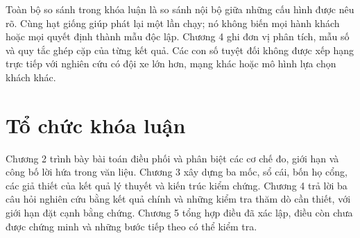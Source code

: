 Toàn bộ so sánh trong khóa luận là so sánh nội bộ giữa những cấu hình được nêu rõ. Cùng
hạt giống giúp phát lại một lần chạy; nó không biến mọi hành khách hoặc mọi quyết định
thành mẫu độc lập. Chương 4 ghi đơn vị phân tích, mẫu số và quy tắc ghép cặp của từng kết
quả. Các con số tuyệt đối không được xếp hạng trực tiếp với nghiên cứu có đội xe lớn hơn,
mạng khác hoặc mô hình lựa chọn khách khác.

\section{Tổ chức khóa luận}

Chương 2 trình bày bài toán điều phối và phân biệt các cơ chế đo, giới hạn và công bố lời
hứa trong văn liệu. Chương 3 xây dựng ba mốc, sổ cái, bốn họ cổng, các giả thiết của kết quả
lý thuyết và kiến trúc kiểm chứng. Chương 4 trả lời ba câu hỏi nghiên cứu bằng kết quả chính
và những kiểm tra thăm dò cần thiết, với giới hạn đặt cạnh bằng chứng. Chương 5 tổng hợp
điều đã xác lập, điều còn chưa được chứng minh và những bước tiếp theo có thể kiểm tra.

